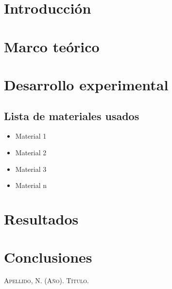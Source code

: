 \documentclass[a4paper,12pt]{article}
\begin{document}



\clearpage


\begin{multicols}{2}


\section{Introducción}


\section{Marco teórico}


\section{Desarrollo experimental}


\subsection{Lista de materiales usados}

\begin{itemize}
    \item Material 1
    \item Material 2
    \item Material 3
    \item Material n
\end{itemize}


\section{Resultados}


\section{Conclusiones}


\end{multicols}

\clearpage
\begin{thebibliography}{1}
     \textsc{Apellido, N. (Año). Título.}
\end{thebibliography}




\end{document}
